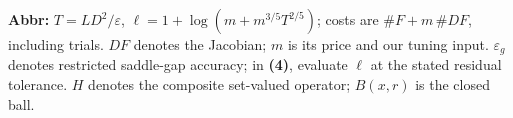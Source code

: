 \begin{table}[tp]
\begin{threeparttable}
\begin{tabularx}{\linewidth}{@{}>{\raggedright\arraybackslash}p{0.20\linewidth}>{\raggedright\arraybackslash}p{0.32\linewidth}>{\raggedright\arraybackslash}p{0.25\linewidth}>{\raggedright\arraybackslash}X@{}}
\bottomrule
\end{tabularx}
\begin{tablenotes}[flushleft]\footnotesize
\item[] \textbf{Abbr:} $T=LD^2/\varepsilon$, $\ell=1+\log(m+m^{3/5}T^{2/5})$; costs are $\#F+m\,\#DF$, including trials. $DF$ denotes the Jacobian; $m$ is its price and our tuning input. $\varepsilon_g$ denotes restricted saddle-gap accuracy; in \textbf{(4)}, evaluate $\ell$ at the stated residual tolerance. $H$ denotes the composite set-valued operator; $B(x,r)$ is the closed ball.
\end{tablenotes}
\end{threeparttable}
\end{table}
\clearpage
